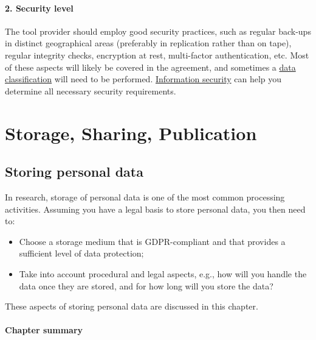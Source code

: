 \documentclass[
]{book}
\providecommand{\tightlist}{%
  \setlength{\itemsep}{0pt}\setlength{\parskip}{0pt}}
\begin{document}
\hypertarget{security-level}{%
\subsection{2. Security level}\label{security-level}}

The tool provider should employ good security practices, such as regular back-ups
in distinct geographical areas (preferably in replication rather than on tape),
regular integrity checks, encryption at rest, multi-factor authentication, etc.
Most of these aspects will likely be covered in the agreement, and sometimes a
\protect\hyperlink{data-classification}{data classification} will need to be performed.
\protect\hyperlink{support}{Information security} can help you determine all necessary security requirements.

\hypertarget{part-storage-sharing-publication}{%
\part*{Storage, Sharing, Publication}\label{part-storage-sharing-publication}}

\hypertarget{data-storage}{%
\chapter{Storing personal data}\label{data-storage}}

In research, storage of personal data is one of the most common processing
activities. Assuming you have a legal basis to store personal data, you
then need to:

\begin{itemize}
\tightlist
\item
  Choose a storage medium that is GDPR-compliant and that provides a sufficient
  level of data protection;
\item
  Take into account procedural and legal aspects, e.g., how will you handle the
  data once they are stored, and for how long will you store the data?
\end{itemize}

These aspects of storing personal data are discussed in this chapter.

\hypertarget{chapter-summary-1}{%
\subsection{Chapter summary}\label{chapter-summary-1}}
\end{document}
